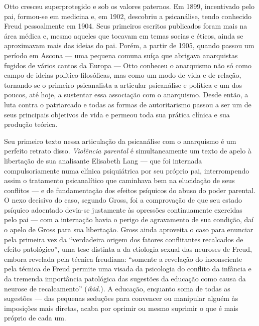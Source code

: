 Otto cresceu superprotegido e sob os valores paternos. Em 1899,
incentivado pelo pai, formou-se em medicina e, em 1902, descobriu a
psicanálise, tendo conhecido Freud pessoalmente em 1904. Seus primeiros
escritos publicados foram mais na área médica e, mesmo aqueles que
tocavam em temas socias e éticos, ainda se aproximavam mais das ideias
do pai. Porém, a partir de 1905, quando passou um período em Ascona ---
uma pequena comuna suíça que abrigava anarquistas fugidos de vários
cantos da Europa --- Otto conheceu o anarquismo não só como campo de
ideias político-filosóficas, mas como um modo de vida e de relação,
tornando-se o primeiro psicanalista a articular psicanálise e política e
um dos poucos, até hoje, a sustentar essa associação com o anarquismo.
Desde então, a luta contra o patriarcado e todas as formas de
autoritarismo passou a ser um de seus principais objetivos de vida e
permeou toda sua prática clínica e sua produção teórica.

Seu primeiro texto nessa articulação da psicanálise com o anarquismo é
um perfeito retrato disso. \emph{Violência parental} é simultaneamente
um texto de apelo à libertação de sua analisante Elisabeth Lang --- que
foi internada compulsoriamente numa clínica psiquiátrica por seu próprio
pai, interrompendo assim o tratamento psicanalítico que caminhava bem na
elucidação de seus conflitos --- e de fundamentação dos efeitos psíquicos
do abuso do poder parental. O nexo decisivo do caso, segundo Gross, foi
a comprovação de que seu estado psíquico adoentado devia-se justamente
às opressões continuamente exercidas pelo pai --- com a internação havia
o perigo de agravamento de sua condição, daí o apelo de Gross para sua
libertação. Gross ainda aproveita o caso para enunciar pela primeira vez
da ``verdadeira origem dos fatores conflitantes recalcados de efeito
patológico'', uma tese distinta a da etiologia sexual das neuroses de
Freud, embora revelada pela técnica freudiana: ``somente a revelação do
inconsciente pela técnica de Freud permite uma visada da psicologia do
conflito da infância e da tremenda importância patológica das sugestões
da educação como causa da neurose de recalcamento'' (\emph{ibid.}). A
educação, enquanto soma de todas as sugestões --- das pequenas seduções
para convencer ou manipular alguém às imposições mais diretas, acaba por
oprimir ou mesmo suprimir o que é mais próprio de cada um.

